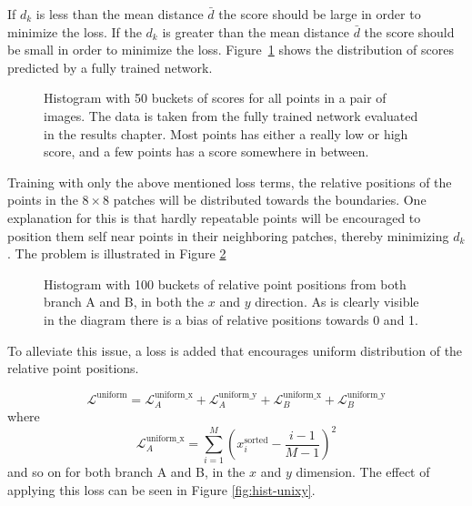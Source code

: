If $d_k$ is less than the mean distance $\bar{d}$ the score should be large in order to minimize the loss. If the $d_k$ is greater than the mean distance $\bar{d}$ the score should be small in order to minimize the loss. Figure~\ref{fig:score-hist} shows the distribution of scores predicted by a fully trained network.

\begin{figure}[H]
	\begin{center}
		
	\end{center}
	\caption{Histogram with 50 buckets of scores for all points in a pair of images. The data is taken from the fully trained network evaluated in the results chapter. Most points has either a really low or high score, and a few points has a score somewhere in between.}
	\label{fig:score-hist}
\end{figure}

Training with only the above mentioned loss terms, the relative positions of the points in the $8\times 8$ patches will be distributed towards the boundaries. One explanation for this is that hardly repeatable points will be encouraged to position them self near points in their neighboring patches, thereby minimizing $d_k$. The problem is illustrated in Figure \ref{fig:hist-no-unixy}

\begin{figure}[H]
	\begin{center}
		
	\end{center}
	\caption{Histogram with 100 buckets of relative point positions from both branch A and B, in both the $x$ and $y$ direction. As is clearly visible in the diagram there is a bias of relative positions towards 0 and 1.}
	\label{fig:hist-no-unixy}
\end{figure}

To alleviate this issue, a loss is added that encourages uniform distribution of the relative point positions.


\begin{equation}
\mathcal{L}^{\textrm{uniform}}=\mathcal{L}^{\textrm{uniform\_x}}_A+\mathcal{L}^{\textrm{uniform\_y}}_A+\mathcal{L}^{\textrm{uniform\_x}}_B+\mathcal{L}^{\textrm{uniform\_y}}_B
\end{equation}
where
\begin{equation}
\mathcal{L}^{\textrm{uniform\_x}}_A=\sum_{i=1}^M\left(x_i^{\textrm{sorted}}-\frac{i-1}{M-1}\right)^2
\end{equation}
and so on for both branch A and B, in the $x$ and $y$ dimension. The effect of applying this loss can be seen in Figure \ref{fig:hist-unixy}.


